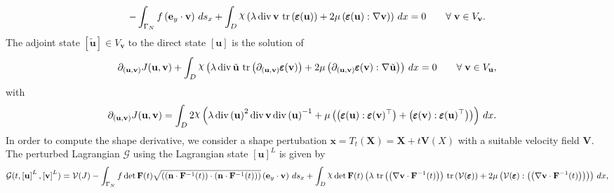 \documentclass[preview]{standalone}
\let\oldcdot\cdot
\let\cdot\oldcdot
\begin{document}
\begin{dmath*}
-  \int_{\Gamma_N} f \left( \mathbf e_y \cdot {\mathbf{ v }} \right) \,ds_x +  \int_{D} \raisebox{\depth}{$\chi$} \left(\lambda \operatorname{div} {\mathbf{ v }}  \,\operatorname{tr}\left(\pmb \varepsilon({\mathbf{ u }})\right)  + 2 \mu \left( \pmb \varepsilon({\mathbf{ u }}) \mathrel{:}  \nabla {\mathbf{ v }}  \right)\right) \,dx = 0\qquad \forall\; {{\mathbf{ v }}\in V_{{\mathbf{ v }}}} . 
\end{dmath*}
The adjoint state $\left[ \tilde{\mathbf{ u }}\right] \in  V_{{\mathbf{ v }}}$ to the direct state $\left[ {\mathbf{ u }}\right]$ is the solution of
\begin{dmath*}
\partial_{({\mathbf{ u }},{\mathbf{ v }})} J({\mathbf{ u }},{\mathbf{ v }}) +  \int_{D} \raisebox{\depth}{$\chi$} \left(\lambda \operatorname{div} \tilde{\mathbf{ u }}  \,\operatorname{tr}\left(\partial_{({\mathbf{ u }},{\mathbf{ v }})} \pmb \varepsilon({\mathbf{ v }})\right)  + 2 \mu \left( \partial_{({\mathbf{ u }},{\mathbf{ v }})} \pmb \varepsilon({\mathbf{ v }}) \mathrel{:}  \nabla \tilde{\mathbf{ u }}  \right)\right) \,dx = 0\qquad \forall\; {{\mathbf{ v }}\in V_{{\mathbf{ u }}}} , 
\end{dmath*}
with 
\begin{align*}
\partial_{({\mathbf{ u }},{\mathbf{ v }})} J({\mathbf{ u }},{\mathbf{ v }}) &=  \int_{D} 2 \raisebox{\depth}{$\chi$} \left(\lambda \operatorname{div}\left( {\mathbf{ u }} \right)^{2} \operatorname{div} {\mathbf{ v }} \operatorname{div}\left( {\mathbf{ u }} \right)^{-1} + \mu \left(\left( \pmb \varepsilon({\mathbf{ u }}) \mathrel{:}  \pmb \varepsilon({\mathbf{ v }})^\top  \right) + \left( \pmb \varepsilon({\mathbf{ v }}) \mathrel{:}  \pmb \varepsilon({\mathbf{ u }})^\top  \right)\right)\right) \,dx.
 \end{align*}
In order to compute the shape derivative, we consider a shape pertubation $\mathbf x = T_t(\mathbf X) = \mathbf X + t \mathbf  V(X)$ with a suitable velocity field $\mathbf V$. The perturbed Lagrangian $\mathcal G$ using the Lagrangian state $\left[ {\mathbf{ u }}\right]^{L}$ is given by
\begin{dmath*}
\mathcal G(t,\left[ {\mathbf{ u }}\right]^{L},\left[ {\mathbf{ v }}\right]^{L}) = \mathcal V(J) -  \int_{\Gamma_N} f  \operatorname{det}\mathbf F( t )  \sqrt{\left( \left( \mathbf n \cdot  \mathbf F^{-1}(t) \right) \cdot \left( \mathbf n \cdot  \mathbf F^{-1}(t) \right) \right)} \left( \mathbf e_y \cdot {\mathbf{ v }} \right) \,ds_x +  \int_{D} \raisebox{\depth}{$\chi$}  \operatorname{det}\mathbf F( t )  \left(\lambda  \,\operatorname{tr}\left(\left(  \nabla {\mathbf{ v }}  \cdot  \mathbf F^{-1}(t) \right)\right)   \,\operatorname{tr}\left(\mathcal V(\pmb \varepsilon)\right)  + 2 \mu \left( \mathcal V(\pmb \varepsilon) \mathrel{:} \left( \left(  \nabla {\mathbf{ v }}  \cdot  \mathbf F^{-1}(t) \right) \right)\right)\right) \,dx , 
\end{dmath*}
\end{document}
